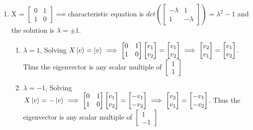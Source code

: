 \documentclass{article}
\begin{document}
\begin{framed}
    \medskip
    \begin{enumerate}
        \item X = $\begin{bmatrix} 0 & 1 \\ 1 & 0 \end{bmatrix} \implies $characteristic equation is $det(\begin{bmatrix} - \lambda & 1 \\ 1 & -\lambda \end{bmatrix}) = \lambda^2 - 1$ and the solution is $\lambda = \pm1$.
        \begin{enumerate}
            \item $\lambda = 1$, Solving $X\ket{v} = \ket{v} \implies \begin{bmatrix} 0 & 1 \\ 1 & 0 \end{bmatrix}\begin{bmatrix} v_1 \\ v_2 \end{bmatrix}=\begin{bmatrix} v_1 \\ v_2 \end{bmatrix} \implies \begin{bmatrix} v_2 \\ v_1 \end{bmatrix}=\begin{bmatrix} v_1 \\ v_2 \end{bmatrix}$. Thus the eigenvector is any scalar multiple of $\begin{bmatrix} 1 \\ 1 \end{bmatrix}$\\
            \item $\lambda = -1$, Solving $X\ket{v} = -\ket{v} \implies \begin{bmatrix} 0 & 1 \\ 1 & 0 \end{bmatrix}\begin{bmatrix} v_1 \\ v_2 \end{bmatrix}=\begin{bmatrix} -v_1 \\ -v_2 \end{bmatrix} \implies \begin{bmatrix} v_2 \\ v_1 \end{bmatrix} = \begin{bmatrix} -v_1 \\ -v_2 \end{bmatrix}$. Thus the eigenvector is any scalar multiple of $\begin{bmatrix} 1 \\ -1 \end{bmatrix}$

\end{enumerate}
\end{enumerate}
\end{framed}
\end{document}
